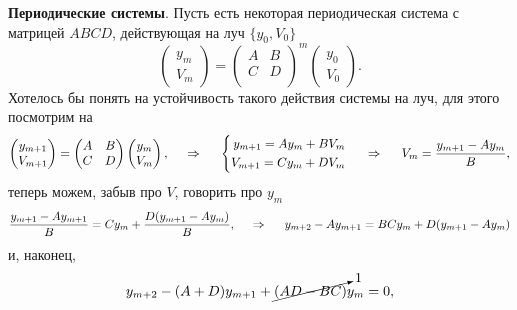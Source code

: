 \textbf{Периодические системы}. 
Пусть есть некоторая периодическая система с матрицей $ABCD$, действующая на луч $\{y_0, V_0\}$
\begin{equation*}
    \begin{pmatrix}
        y_m \\ V_m
    \end{pmatrix} = 
    \begin{pmatrix}
        A & B \\
        C & D \\
    \end{pmatrix}^m
    \begin{pmatrix}
        y_0 \\ V_0
    \end{pmatrix}.
\end{equation*}
Хотелось бы понять на устойчивость такого действия системы на луч, для этого посмотрим на 
\begin{equation*}
    \begin{pmatrix}
        y_{m+1} \\ V_{m+1}
    \end{pmatrix} = 
    \begin{pmatrix}
        A & B \\
        C & D \\
    \end{pmatrix} \begin{pmatrix}
        y_m \\ V_m
    \end{pmatrix},
    \hspace{0.5cm} \Rightarrow \hspace{0.5cm}
    \left\{\begin{aligned}
        y_{m+1} = A y_m + B V_m \\
        V_{m+1} = C y_m + D V_m
    \end{aligned}\right.
    \hspace{0.5cm} \Rightarrow \hspace{0.5cm}
    V_m = \frac{y_{m+1}-Ay_m}{B},
\end{equation*}
теперь можем, забыв про $V$, говорить про $y_m$
\begin{equation*}
    \frac{y_{m+1}-A y_{m+1}}{B} = C y_m + \frac{D (y_{m+1}-Ay_m)}{B},
    \hspace{0.5cm} \Rightarrow \hspace{0.5cm}
    y_{m+2} - A y_{m+1} = BC y_m + D (y_{m+1} - A y_m)
\end{equation*}
и, наконец,
\begin{equation*}
    y_{m+2} - (A+D) y_{m+1} + 
    \cancelto{1}{(A D - B C)}
     y_m = 0,
\end{equation*}
